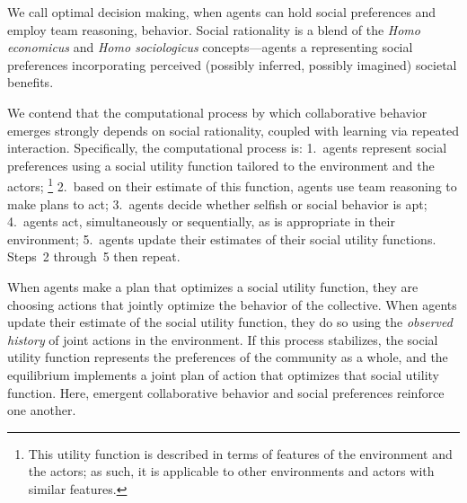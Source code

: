 We call optimal decision making, when agents can hold
social preferences and employ team reasoning,  behavior.  Social rationality is a blend of the \emph{Homo
  economicus\/} and \emph{Homo sociologicus\/} concepts---agents
 a  representing
social preferences incorporating
perceived (possibly inferred, possibly imagined) societal benefits.

We contend that the computational process by which collaborative
behavior emerges strongly depends on social rationality, coupled with
learning via repeated interaction.
%
Specifically, the computational process is:
1.~agents represent social preferences using a social utility function
tailored to the environment and the actors;%
\footnote{This utility function is described in terms of features of the environment and the actors;
as such, it is applicable to other environments and actors with similar features.}
2.~based on their estimate of this function, agents use team reasoning to make plans to act;
3.~agents decide whether selfish or social behavior is apt;
4.~agents act, simultaneously or sequentially, as is appropriate in their environment;
5.~agents update their estimates of their social utility functions.
Steps~2 through~5 then repeat.

When agents
make a plan that optimizes a social
utility function, they are choosing actions that jointly optimize the
behavior of the collective.
When agents update their estimate of the social utility function, they
do so using the \emph{observed history} of joint actions in the environment.
If this process stabilizes, the social utility function represents the
preferences of the community as a whole, 
and the equilibrium implements a joint plan of action that optimizes
that social utility function.  Here, %
emergent collaborative behavior and social preferences 
reinforce one another.


